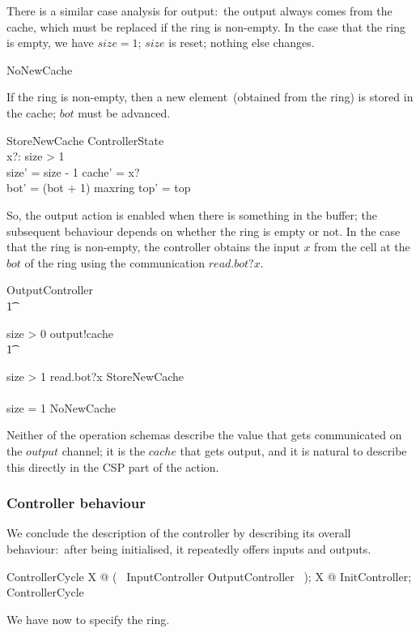 \documentclass{article}
\begin{document}
There is a similar case analysis for output:~the output always comes
from the cache, which must be replaced if the ring is non-empty.  In
the case that the ring is empty, we have $size = 1$; $size$ is reset;
nothing else changes.
\begin{zed}
  NoNewCache 
\end{zed}
If the ring \pagebreak is non-empty, then a new element~(obtained from
the ring) is stored in the cache; $bot$ must be advanced.
\begin{schema}{StoreNewCache}
  \Delta ControllerState
  \\ %
  x?: \nat
  \where %
  size > 1
  \\ %
  size' = size - 1 \land cache' = x?
  \\ %
  bot' = (bot + 1) \mod maxring \land top' = top
\end{schema}
So, the output action is enabled when there is something in the
buffer; the subsequent behaviour depends on whether the ring is empty
or not.  In the case that the ring is non-empty, the controller
obtains the input $x$ from the cell at the $bot$ of the ring using the
communication $read.bot?x$.
\begin{zed}
  OutputController 
  \\ %
  \t1
  \begin{block}
    size > 0 \guard output!cache \then
    \\ %
    \t1
    \begin{block}
      size > 1 \guard read.bot?x \then StoreNewCache
      \\ %
      \extchoice
      \\ %
      size = 1 \guard NoNewCache
    \end{block}
  \end{block}
\end{zed}
Neither of the operation schemas describe the value that gets
communicated on the $output$ channel; it is the $cache$ that gets
output, and it is natural to describe this directly in the CSP part of
the action.

\subsubsection{Controller behaviour}

We conclude the description of the controller by describing its
overall behaviour:~after being initialised, it repeatedly offers
inputs and outputs.
\begin{zed}
  ControllerCycle  \mu X @ (~ InputController \extchoice
  OutputController ~); X
  \also %
  @ InitController; ControllerCycle
  \also %
  \circend
\end{zed}
We have now to specify the ring.
\end{document}
